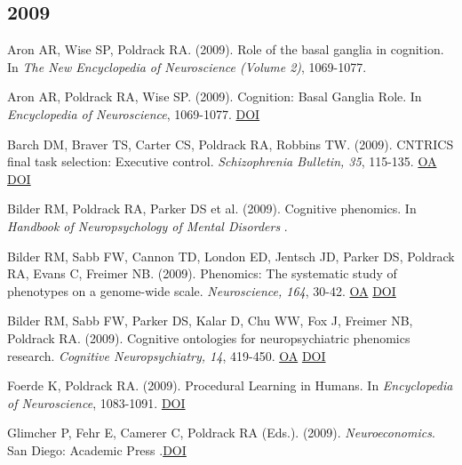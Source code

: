 \documentclass[10pt, letterpaper]{article}
\begin{document}
\subsection*{2009}Aron AR, Wise SP, Poldrack RA.  (2009). Role of the basal ganglia in cognition. In \textit{The New Encyclopedia of Neuroscience (Volume 2)}, 1069-1077. \vspace{2mm}

Aron AR, Poldrack RA, Wise SP.  (2009). Cognition: Basal Ganglia Role. In \textit{Encyclopedia of Neuroscience}, 1069-1077. \href{https://doi.org/10.1016/b978-008045046-9.00410-1}{DOI} \vspace{2mm}

Barch DM, Braver TS, Carter CS, Poldrack RA, Robbins TW.  (2009). CNTRICS final task selection: Executive control. \textit{Schizophrenia Bulletin, 35}, 115-135. \href{https://www.ncbi.nlm.nih.gov/pmc/articles/PMC2643948}{OA} \href{https://doi.org/10.1093/schbul/sbn154}{DOI} \vspace{2mm}

Bilder RM, Poldrack RA, Parker DS et al. (2009). Cognitive phenomics. In \textit{Handbook of Neuropsychology of Mental Disorders }. \vspace{2mm}

Bilder RM, Sabb FW, Cannon TD, London ED, Jentsch JD, Parker DS, Poldrack RA, Evans C, Freimer NB.  (2009). Phenomics: The systematic study of phenotypes on a genome-wide scale. \textit{Neuroscience, 164}, 30-42. \href{https://www.ncbi.nlm.nih.gov/pmc/articles/PMC2760679}{OA} \href{https://doi.org/10.1016/j.neuroscience.2009.01.027}{DOI} \vspace{2mm}

Bilder RM, Sabb FW, Parker DS, Kalar D, Chu WW, Fox J, Freimer NB, Poldrack RA.  (2009). Cognitive ontologies for neuropsychiatric phenomics research. \textit{Cognitive Neuropsychiatry, 14}, 419-450. \href{https://www.ncbi.nlm.nih.gov/pmc/articles/PMC2752634}{OA} \href{https://doi.org/10.1080/13546800902787180}{DOI} \vspace{2mm}

Foerde K, Poldrack RA.  (2009). Procedural Learning in Humans. In \textit{Encyclopedia of Neuroscience}, 1083-1091. \href{https://doi.org/10.1016/b978-008045046-9.00783-x}{DOI} \vspace{2mm}

Glimcher P, Fehr E, Camerer C, Poldrack RA (Eds.).  (2009).  \textit{Neuroeconomics}. San Diego: Academic Press .\href{https://doi.org/10.1016/b978-0-12-374176-9.x0001-2}{DOI} \vspace{2mm}
\end{document}
